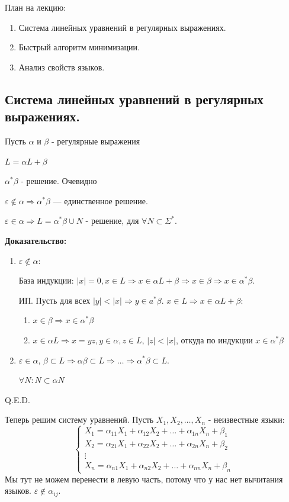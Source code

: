 План на лекцию:
\begin{enumerate}
    \item Система линейных уравнений в регулярных выражениях.
    \item Быстрый алгоритм минимизации.
    \item Анализ свойств языков.
\end{enumerate}

\subsection{Система линейных уравнений в регулярных выражениях.}

Пусть $\alpha$ и $\beta$ - регулярные выражения

$L = \alpha L + \beta $

 $\alpha^*\beta$ - решение. Очевидно


$\varepsilon \not \in \alpha \Rightarrow \alpha^*\beta $ --- единственное решение.

$\varepsilon \in \alpha \Rightarrow L = \alpha^*\beta \cup N$ - решение, для $\forall N \subset \Sigma^*$.

\textbf{Доказательство:}
\begin{enumerate}
    \item $\varepsilon \not \in \alpha$:

    База индукции: $|x|= 0, x \in L \Rightarrow x\in \alpha L+\beta \Rightarrow x\in \beta \Rightarrow x\in \alpha^* \beta$.

    ИП. Пусть для всех $|y|<|x| \Rightarrow y \in a^*\beta$.   $x\in L \Rightarrow x\in\alpha L + \beta:$ 
    \begin{enumerate}
        \item $x\in \beta \Rightarrow x\in \alpha^* \beta$
        \item $x \in \alpha L \Rightarrow 
        x = yz,y\in \alpha, z \in L$, $|z|<|x|$, откуда по индукции $x\in \alpha^* \beta$
    \end{enumerate}
    \item $\varepsilon \in \alpha$, $\beta \subset L \Rightarrow \alpha \beta \subset L \Rightarrow \ldots \Rightarrow \alpha^* \beta \subset L$.

    $\forall N: N \subset \alpha N$
\end{enumerate}

\hfill Q.E.D.

Теперь решим систему уравнений. Пусть $X_1,X_2,\ldots, X_n$ - неизвестные языки:
$$\begin{cases}
    X_1 = \alpha_{11}X_1 + \alpha_{12}X_2 + \ldots + \alpha_{1n}X_n  + \beta_1\\
    X_2 = \alpha_{21}X_1 + \alpha_{22}X_2 + \ldots + \alpha_{2n}X_n + \beta_2
\\
\vdots \\
X_n = \alpha_{n1}X_1 + \alpha_{n2}X_2 + \ldots +\alpha_{nn}X_n + \beta_n
\end{cases}$$
Мы тут не можем перенести в левую часть, потому что у нас нет вычитания языков. $\varepsilon \not \in \alpha_{ij}$.

